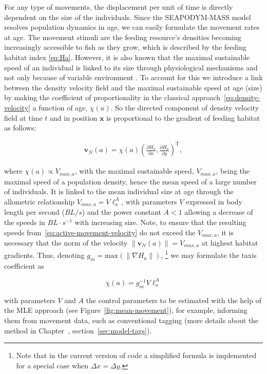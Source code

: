 For any type of movements, the displacement per unit of time is directly dependent on the size of the individuals. Since the SEAPODYM-MASS model resolves population dynamics in age, we can easily formulate the movement rates at age. The movement stimuli are the feeding resource's densities becoming increasingly accessible to fish as they grow, which is described by the feeding habitat index \eqref{eq:Ha}. However, it is also known that the maximal sustainable speed of an individual is linked to its size through physiological mechanisms and not only because of variable environment \citep*[see e.g.,][]{Cayre, Brill, Nihira, Turchin}. To account for this we introduce a link between the density velocity field and the maximal sustainable speed at age (size) by making the coefficient of proportionality in the classical approach~\eqref{eq:density-velocity} a function of age, $\chi(a)$. So the directed component of density velocity field at time $t$ and in position $\mathbf{x}$ is proportional to the gradient of feeding habitat as follows:  

\begin{align}
	\mathbf v_N(a) = \chi(a)\left(\frac{\partial H_{a}}{\partial x}, \frac{\partial H_{a}}{\partial y}\right)^{\text{T}},
\label{eq:active-movement-velocity}	
\end{align}

\noindent where $\chi(a)\propto V_{max,a}$, with the maximal sustainable speed, $V_{max,a}$, being the maximal speed of a population density, hence the mean speed of a large number of individuals. It is linked to the mean individual size at age through the allometric relationship $V_{max,a}=V\ell_a^A$, with parameters $V$ expressed in body length per second ($BL/s$) and the power constant $A<1$ allowing a decrease of the speeds in $BL\cdot s^{-1}$ with increasing size. Note, to ensure that the resulting speeds from~\eqref{eq:active-movement-velocity} do not exceed the $V_{max,a}$, it is necessary that the norm of the velocity $\|\mathbf{v}_N(a)\|=V_{max,a}$ at highest habitat gradients. Thus, denoting $g_{m}=\text{max}(\|\nabla H_a\|)$, \footnote{Note that in the current version of code a simplified formula is implemented for a special case when $\Delta x = \Delta y$.} we may formulate the taxis coefficient as 

\begin{equation}
\chi(a)=g^{-1}_{m} V \ell_a^A 
\label{eq:taxis-coefficient}
\end{equation}

\noindent with parameters $V$ and $A$ the control parameters to be estimated with the help of the MLE approach (see Figure~\ref{fig:mean-movement}),  for example, informing them from movement data, such as conventional tagging (more details about the method in Chapter~{}, section~\ref{sec:model-tags}).

